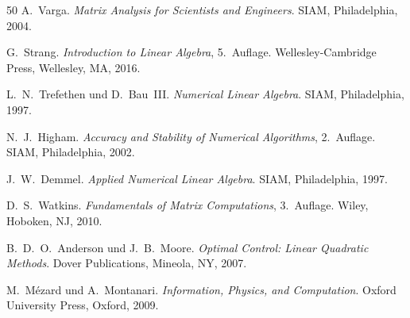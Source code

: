 \documentclass[a4paper,12pt]{report}
\theoremstyle{definition}
\begin{document}
\begin{thebibliography}{50}
A.~Varga.
\newblock \textit{Matrix Analysis for Scientists and Engineers}.
\newblock SIAM, Philadelphia, 2004.

G.~Strang.
\newblock \textit{Introduction to Linear Algebra}, 5.~Auflage.
\newblock Wellesley-Cambridge Press, Wellesley, MA, 2016.

L.~N.~Trefethen und D.~Bau~III.
\newblock \textit{Numerical Linear Algebra}.
\newblock SIAM, Philadelphia, 1997.

N.~J.~Higham.
\newblock \textit{Accuracy and Stability of Numerical Algorithms}, 2.~Auflage.
\newblock SIAM, Philadelphia, 2002.

J.~W.~Demmel.
\newblock \textit{Applied Numerical Linear Algebra}.
\newblock SIAM, Philadelphia, 1997.

D.~S.~Watkins.
\newblock \textit{Fundamentals of Matrix Computations}, 3.~Auflage.
\newblock Wiley, Hoboken, NJ, 2010.

B.~D.~O.~Anderson und J.~B.~Moore.
\newblock \textit{Optimal Control: Linear Quadratic Methods}.
\newblock Dover Publications, Mineola, NY, 2007.

M.~Mézard und A.~Montanari.
\newblock \textit{Information, Physics, and Computation}.
\newblock Oxford University Press, Oxford, 2009.

\end{thebibliography}
\end{document}
